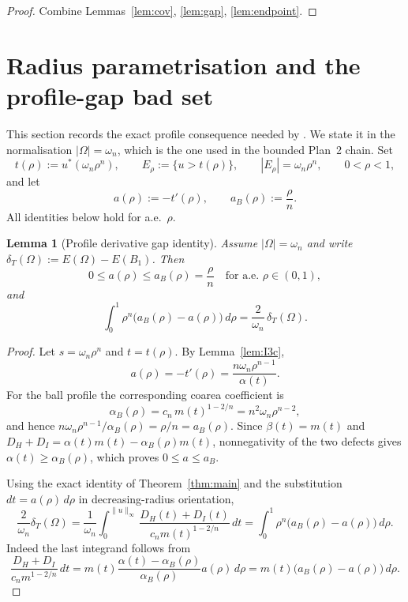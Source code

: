 \documentclass[11pt]{article}
\newtheorem{lemma}[theorem]{Lemma}
\theoremstyle{definition}
\newcommand{\Om}{\Omega}
\begin{document}
\begin{proof}
Combine Lemmas~\ref{lem:cov}, \ref{lem:gap}, \ref{lem:endpoint}.
\end{proof}

\section{Radius parametrisation and the profile-gap bad set}
\label{sec:profile-gap}

This section records the exact profile consequence needed by
\cite{WeightedMetricTrace}.  We state it in the normalisation
$|\Om|=\omega_n$, which is the one used in the bounded Plan~2 chain.
Set
\[
   t(\rho):=u^*(\omega_n\rho^n),\qquad
   E_\rho:=\{u>t(\rho)\},\qquad
   |E_\rho|=\omega_n\rho^n,
   \qquad 0<\rho<1,
\]
and let
\[
   a(\rho):=-t'(\rho),\qquad a_B(\rho):=\frac{\rho}{n}.
\]
All identities below hold for a.e.\ $\rho$.

\begin{lemma}[Profile derivative gap identity]\label{lem:profile-gap}
Assume $|\Om|=\omega_n$ and write
$\delta_T(\Om):=E(\Om)-E(B_1)$.  Then
\begin{equation}\label{eq:profile-gap-identity}
   0\le a(\rho)\le a_B(\rho)=\frac{\rho}{n}
   \quad\text{for a.e. }\rho\in(0,1),
\end{equation}
and
\begin{equation}\label{eq:profile-gap-int}
   \int_0^1 \rho^n\bigl(a_B(\rho)-a(\rho)\bigr)\,d\rho
   =\frac{2}{\omega_n}\,\delta_T(\Om).
\end{equation}
\end{lemma}

\begin{proof}
Let $s=\omega_n\rho^n$ and $t=t(\rho)$.  By Lemma~\ref{lem:I3c},
\[
   a(\rho)
   =-t'(\rho)
   =\frac{n\omega_n\rho^{n-1}}{\alpha(t)}.
\]
For the ball profile the corresponding coarea coefficient is
\[
   \alpha_B(\rho)
   =c_n\,m(t)^{1-2/n}
   =n^2\omega_n\rho^{n-2},
\]
and hence $n\omega_n\rho^{n-1}/\alpha_B(\rho)=\rho/n=a_B(\rho)$.
Since $\beta(t)=m(t)$ and $D_H+D_I=\alpha(t)m(t)-\alpha_B(\rho)m(t)$,
nonnegativity of the two defects gives $\alpha(t)\ge\alpha_B(\rho)$,
which proves $0\le a\le a_B$.

Using the exact identity of Theorem~\ref{thm:main} and the substitution
$dt=a(\rho)\,d\rho$ in decreasing-radius orientation,
\[
   \frac{2}{\omega_n}\delta_T(\Om)
   =\frac1{\omega_n}\int_0^{\|u\|_\infty}
     \frac{D_H(t)+D_I(t)}{c_n m(t)^{1-2/n}}\,dt
   =\int_0^1 \rho^n\bigl(a_B(\rho)-a(\rho)\bigr)\,d\rho.
\]
Indeed the last integrand follows from
\[
   \frac{D_H+D_I}{c_n m^{1-2/n}}\,dt
   =m(t)\frac{\alpha(t)-\alpha_B(\rho)}{\alpha_B(\rho)}
      a(\rho)\,d\rho
   =m(t)\bigl(a_B(\rho)-a(\rho)\bigr)\,d\rho .
\]
\end{proof}
\end{document}
